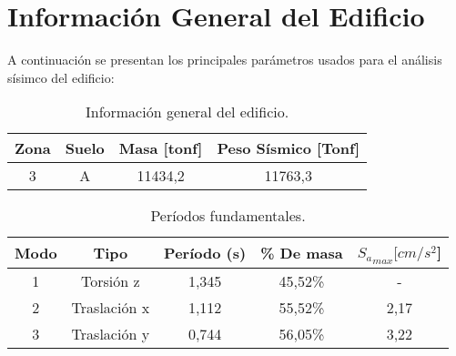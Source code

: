 \section{Información General del Edificio}
    A continuación se presentan los principales parámetros usados para el análisis sísimco del edificio:
    
    \begin{table}[H]
      \centering
      \caption{Información general del edificio.}
        \begin{tabular}{cccc}
            \toprule
            \textbf{Zona} & \multicolumn{1}{c}{\textbf{Suelo}} & \textbf{Masa [tonf]} & \textbf{Peso Sísmico [Tonf]} \\
            \midrule
            3     & A     & 11434,2 & 11763,3 \\
            \bottomrule
        \end{tabular}%
      \label{info_general}%
    \end{table}%
    
    \begin{table}[H]
      \centering
      \caption{Períodos fundamentales.}
        \begin{tabular}{ccccc}
            \toprule
            \textbf{Modo} & \textbf{Tipo} & \textbf{Período (s)} & \textbf{\% De masa} & \multicolumn{1}{c}{\textbf{${S_a}_{max} [cm/s^2$]}} \\
            \midrule
                1   & Torsión z     & 1,345     & 45,52\%   & - \\
                2   & Traslación x  & 1,112     & 55,52\%   & 2,17 \\
                3   & Traslación y  & 0,744     & 56,05\%   & 3,22 \\
            \bottomrule
        \end{tabular}%
      \label{periodos}%
    \end{table}%